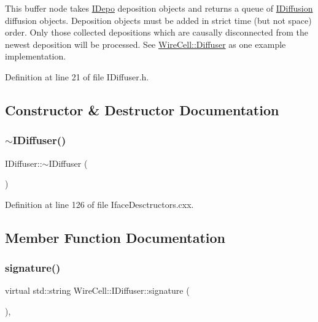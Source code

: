 This buffer node takes \hyperlink{class_wire_cell_1_1_i_depo}{I\+Depo} deposition objects and returns a queue of \hyperlink{class_wire_cell_1_1_i_diffusion}{I\+Diffusion} diffusion objects. Deposition objects must be added in strict time (but not space) order. Only those collected depositions which are causally disconnected from the newest deposition will be processed. See \hyperlink{class_wire_cell_1_1_diffuser}{Wire\+Cell\+::\+Diffuser} as one example implementation. 

Definition at line 21 of file I\+Diffuser.\+h.



\subsection{Constructor \& Destructor Documentation}
\mbox{\label{class_wire_cell_1_1_i_diffuser_a54fa317f257b086464070a3d737111be}} 
\subsubsection{\texorpdfstring{$\sim$\+I\+Diffuser()}{~IDiffuser()}}
{\footnotesize\ttfamily I\+Diffuser\+::$\sim$\+I\+Diffuser (\begin{DoxyParamCaption}{ }\end{DoxyParamCaption})\hspace{0.3cm}{\ttfamily [virtual]}}



Definition at line 126 of file Iface\+Desctructors.\+cxx.



\subsection{Member Function Documentation}
\mbox{\label{class_wire_cell_1_1_i_diffuser_a2e4e79b2547743bd56edf28e634b85ee}} 
\subsubsection{\texorpdfstring{signature()}{signature()}}
{\footnotesize\ttfamily virtual std\+::string Wire\+Cell\+::\+I\+Diffuser\+::signature (\begin{DoxyParamCaption}{ }\end{DoxyParamCaption})\hspace{0.3cm}{\ttfamily [inline]}, {\ttfamily [virtual]}}

